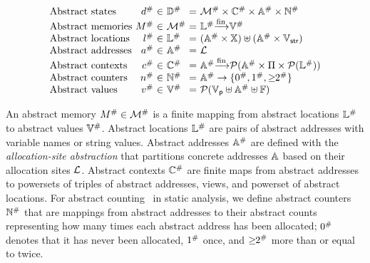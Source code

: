 \[
  \begin{array}{l@{~}r@{~}c@{~}l@{~}c@{~}l}
\text{Abstract states} & \abselem &\in& \absdom &=& \absmemset \times \absctxtset
\times \absaddrset \times \abscountset\\
\text{Abstract memories} & \absmem &\in& \absmemset &=& \abslocset \finmap
\absvalset\\
\text{Abstract locations} & \absloc &\in& \abslocset &=& (\absaddrset \times
\varset) \uplus (\absaddrset \times \strset)\\
\text{Abstract addresses} & \absaddr &\in& \absaddrset &=& \labset\\
\text{Abstract contexts} & \absctxt &\in& \absctxtset &=& \absaddrset \finmap
\powerset{\absaddrset \times \viewset \times \powerset{\abslocset}}\\
\text{Abstract counters} & \abscount &\in& \abscountset &=& \absaddrset
\rightarrow \{ \abszero, \absone, \absmany \}\\
\text{Abstract values} & \absval &\in& \absvalset &=& \powerset{\pvalset
\uplus \absaddrset \uplus \fvalset}\\
  \end{array}
\]

An abstract memory ${M}^{\#} \in {\mathcal{M}}^{\#}$ is a finite mapping from abstract
locations ${\mathbb{L}}^{\#}$ to abstract values ${\mathbb{V}}^{\#}$.  Abstract locations
${\mathbb{L}}^{\#}$ are pairs of abstract addresses with variable names or string
values. Abstract addresses ${\mathbb{A}}^{\#}$ are defined with the
\textit{allocation-site abstraction} that partitions concrete addresses
$\mathbb{A}$ based on their allocation sites $\mathcal{L}$.  Abstract contexts
${\mathbb{C}}^{\#}$ are finite maps from abstract addresses to powersets of triples of
abstract addresses, views, and powerset of abstract locations.  For abstract
counting~\cite{abstract-gc-counting, revisit-recency} in static analysis, we
define abstract counters ${\mathbb{N}}^{\#}$ that are mappings from abstract addresses to
their abstract counts representing how many times each abstract address has been
allocated; ${0}^{\#}$ denotes that it has never been allocated, ${1}^{\#}$ once,
and ${\geq\!\!2}^{\#}$ more than or equal to twice.

